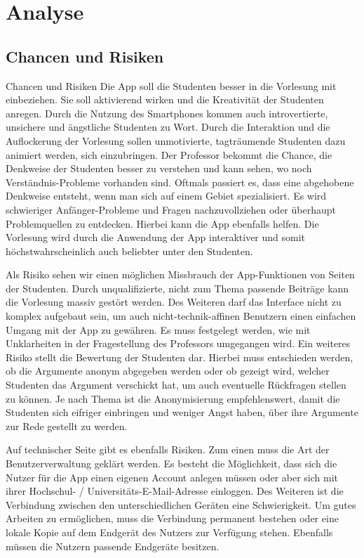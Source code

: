 \chapter{Analyse}
\label{chap:analyse}

\section{Chancen und Risiken}
\label{sec:chances}

Chancen und Risiken
Die App soll die Studenten besser in die Vorlesung mit einbeziehen. Sie soll aktivierend wirken und die Kreativität der Studenten anregen. Durch die Nutzung des Smartphones kommen auch introvertierte, unsichere und ängstliche Studenten zu Wort. Durch die Interaktion und die Auflockerung der Vorlesung sollen unmotivierte, tagträumende Studenten dazu animiert werden, sich einzubringen. 
Der Professor bekommt die Chance, die Denkweise der Studenten besser zu verstehen und kann sehen, wo noch Verständnis-Probleme vorhanden sind. Oftmals passiert es, dass eine abgehobene Denkweise entsteht, wenn man sich auf einem Gebiet spezialisiert. Es wird schwieriger Anfänger-Probleme und Fragen nachzuvollziehen oder überhaupt Problemquellen zu entdecken. Hierbei kann die App ebenfalls helfen. Die Vorlesung wird durch die Anwendung der  App interaktiver und somit höchstwahrscheinlich auch beliebter unter den Studenten.

Als Risiko sehen wir einen möglichen Missbrauch der App-Funktionen von Seiten der Studenten. Durch unqualifizierte, nicht zum Thema passende Beiträge kann die Vorlesung massiv gestört werden. 
Des Weiteren darf das Interface nicht zu komplex aufgebaut sein, um auch nicht-technik-affinen Benutzern einen einfachen Umgang mit der App zu gewähren. 
Es muss festgelegt werden, wie mit Unklarheiten in der Fragestellung des Professors umgegangen wird. Ein weiteres Risiko stellt die Bewertung der Studenten dar. Hierbei muss entschieden werden, ob die Argumente anonym abgegeben werden oder ob gezeigt wird, welcher Studenten das Argument verschickt hat, um auch eventuelle Rückfragen stellen zu können. Je nach Thema ist die Anonymisierung empfehlenswert, damit die Studenten sich eifriger einbringen und weniger Angst haben, über ihre Argumente zur Rede gestellt zu werden.

Auf technischer Seite gibt es ebenfalls Risiken. Zum einen muss die Art der Benutzerverwaltung geklärt werden. Es besteht die Möglichkeit, dass sich die Nutzer für die App einen eigenen Account anlegen müssen oder aber sich mit ihrer Hochschul- / Universitäts-E-Mail-Adresse einloggen. 
Des Weiteren ist die Verbindung zwischen den unterschiedlichen Geräten eine Schwierigkeit. Um gutes Arbeiten zu ermöglichen, muss die Verbindung permanent bestehen oder eine lokale Kopie auf dem Endgerät des Nutzers zur Verfügung stehen. Ebenfalls müssen die Nutzern passende Endgeräte besitzen.

